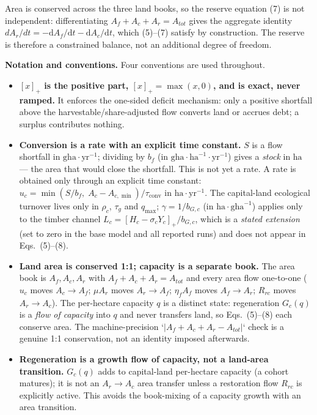 \documentclass[11pt]{article}
\begin{document}
Area is conserved across the three land books, so the reserve equation (7) is not independent: differentiating $A_f+A_c+A_r=A_{tot}$ gives the aggregate identity $dA_r/dt=-\mathrm{d}A_f/\mathrm{d}t-\mathrm{d}A_c/\mathrm{d}t$, which (5)--(7) satisfy by construction. The reserve is therefore a constrained balance, not an additional degree of freedom.

\textbf{Notation and conventions.} Four conventions are used throughout.

\begin{itemize}
\item \textbf{$[x]_+$ is the positive part, $[x]_+=\max(x,0)$, and is exact, never ramped.} It enforces the one-sided deficit mechanism: only a positive shortfall above the harvestable/share-adjusted flow converts land or accrues debt; a surplus contributes nothing.
\item \textbf{Conversion is a rate with an explicit time constant.} $S$ is a flow shortfall in $\text{gha}\cdot\text{yr}^{-1}$; dividing by $b_f$ (in $\text{gha}\cdot\text{ha}^{-1}\cdot\text{yr}^{-1}$) gives a \emph{stock} in $\text{ha}$ — the area that would close the shortfall. This is not yet a rate. A rate is obtained only through an explicit time constant: $u_c=\min\left(S/b_f,\;A_c-A_{c,\min}\right)/\tau_{\mathrm{conv}}$ in $\text{ha}\cdot\text{yr}^{-1}$. The capital-land ecological turnover lives only in $\rho_c$, $\tau_g$ and $q_{\max}$; $\gamma=1/b_{G,c}$ (in $\text{ha}\cdot\text{gha}^{-1}$) applies only to the timber channel $L_c=[H_c-\sigma_c Y_c]_+/b_{G,c}$, which is a \emph{stated extension} (set to zero in the base model and all reported runs) and does not appear in Eqs.~(5)--(8).
\item \textbf{Land area is conserved 1:1; capacity is a separate book.} The area book is $A_f,A_c,A_r$ with $A_f+A_c+A_r=A_{tot}$ and every area flow one-to-one ($u_c$ moves $A_c\to A_f$; $\mu A_r$ moves $A_r\to A_f$; $\eta_f A_f$ moves $A_f\to A_r$; $R_{rc}$ moves $A_r\to A_c$). The per-hectare capacity $q$ is a distinct state: regeneration $G_c(q)$ is a \emph{flow of capacity} into $q$ and never transfers land, so Eqs.~(5)--(8) each conserve area. The machine-precision `$|A_f+A_c+A_r-A_{tot}|$` check is a genuine 1:1 conservation, not an identity imposed afterwards.
\item \textbf{Regeneration is a growth flow of capacity, not a land-area transition.} $G_c(q)$ adds to capital-land per-hectare capacity (a cohort matures); it is not an $A_r\to A_c$ area transfer unless a restoration flow $R_{rc}$ is explicitly active. This avoids the book-mixing of a capacity growth with an area transition.

\end{itemize}
\end{document}
